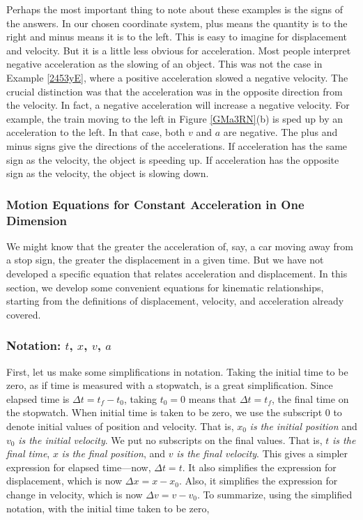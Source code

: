 \documentclass[main-ap-physics.tex]{subfiles}
\begin{document}
Perhaps the most important thing to note about these examples is the signs of the answers. In our chosen coordinate system, plus means the quantity is to the right and minus means it is to the left. This is easy to imagine for displacement and velocity. But it is a little less obvious for acceleration. Most people interpret negative acceleration as the slowing of an object. This was not the case in Example \ref{2453yE}, where a positive acceleration slowed a negative velocity. The crucial distinction was that the acceleration was in the opposite direction from the velocity. In fact, a negative acceleration will increase a negative velocity. For example, the train moving to the left in Figure \ref{GMa3RN}(b) is sped up by an acceleration to the left. In that case, both $v$ and $a$ are negative. The plus and minus signs give the directions of the accelerations. If acceleration has the same sign as the velocity, the object is speeding up. If acceleration has the opposite sign as the velocity, the object is slowing down.

\subsubsection{Motion Equations for Constant Acceleration in One Dimension} \label{WbwyTy}

We might know that the greater the acceleration of, say, a car moving away from a stop sign, the greater the displacement in a given time. But we have not developed a specific equation that relates acceleration and displacement. In this section, we develop some convenient equations for kinematic relationships, starting from the definitions of displacement, velocity, and acceleration already covered.

\subsubsection*{Notation: $t$, $x$, $v$, $a$}

First, let us make some simplifications in notation. Taking the initial time to be zero, as if time is measured with a stopwatch, is a great simplification. Since elapsed time is $\Delta t = t_f - t_0$, taking $t_0 = 0$ means that $\Delta t = t_f$, the final time on the stopwatch. When initial time is taken to be zero, we use the subscript 0 to denote initial values of position and velocity. That is, $x_0$ \textit{is the initial position} and $v_0$ \textit{is the initial velocity}. We put no subscripts on the final values. That is, $t$ \textit{is the final time}, $x$ \textit{is the final position}, and $v$ \textit{is the final velocity}. This gives a simpler expression for elapsed time---now, $\Delta t = t$. It also simplifies the expression for displacement, which is now $\Delta x = x - x_0$. Also, it simplifies the expression for change in velocity, which is now $\Delta v = v - v_0$. To summarize, using the simplified notation, with the initial time taken to be zero,
\end{document}
